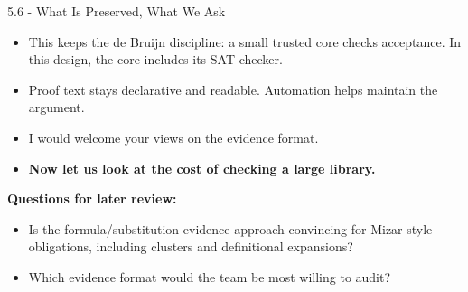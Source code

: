 \documentclass[aspectratio=169,11pt]{beamer}
\begin{document}
\begin{frame}[fragile,t]{5.6 - What Is Preserved, What We Ask}
\begin{itemize}
\setlength{\itemsep}{1pt}
\setlength{\parsep}{0pt}
\setlength{\parskip}{0pt}
\item This keeps the de Bruijn discipline: a small trusted core checks acceptance. In this design, the core includes its SAT checker.
\item Proof text stays declarative and readable. Automation helps maintain the argument.
\item I would welcome your views on the evidence format.
\item \textcolor{blue!55!black}{\textbf{Now let us look at the cost of checking a large library.}}
\end{itemize}
\smallskip
\textbf{Questions for later review:}
\begin{itemize}
\setlength{\itemsep}{1pt}
\setlength{\parsep}{0pt}
\setlength{\parskip}{0pt}
\item Is the formula/substitution evidence approach convincing for Mizar-style obligations, including clusters and definitional expansions?
\item Which evidence format would the team be most willing to audit?
\end{itemize}
\end{frame}
\end{document}
